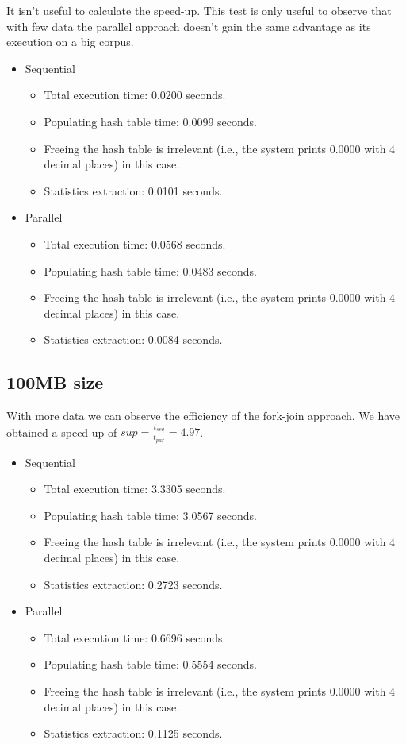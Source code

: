 It isn't useful to calculate the speed-up. This test is only useful to observe that with few data the parallel approach doesn't gain the same advantage as its execution on a big corpus.
\begin{itemize}
    \item Sequential
    \begin{itemize}
        \item Total execution time: 0.0200 seconds.
        \item Populating hash table time: 0.0099 seconds.
        \item Freeing the hash table is irrelevant (i.e., the system prints 0.0000 with 4 decimal places) in this case.
        \item Statistics extraction: 0.0101 seconds.
    \end{itemize}
    \item Parallel
    \begin{itemize}
        \item Total execution time: 0.0568 seconds.
        \item Populating hash table time: 0.0483 seconds.
        \item Freeing the hash table is irrelevant (i.e., the system prints 0.0000 with 4 decimal places) in this case.
        \item Statistics extraction: 0.0084 seconds.
    \end{itemize}
\end{itemize}

\subsection{100MB size}
With more data we can observe the efficiency of the fork-join approach. We have obtained a speed-up of $sup=\tfrac{t_{seq}}{t_{par}}=4.97$.
\begin{itemize}
    \item Sequential
    \begin{itemize}
        \item Total execution time: 3.3305 seconds.
        \item Populating hash table time: 3.0567 seconds.
        \item Freeing the hash table is irrelevant (i.e., the system prints 0.0000 with 4 decimal places) in this case.
        \item Statistics extraction: 0.2723 seconds.
    \end{itemize}
    \item Parallel
    \begin{itemize}
        \item Total execution time: 0.6696 seconds.
        \item Populating hash table time: 0.5554 seconds.
        \item Freeing the hash table is irrelevant (i.e., the system prints 0.0000 with 4 decimal places) in this case.
        \item Statistics extraction: 0.1125 seconds.
    \end{itemize}
\end{itemize}

